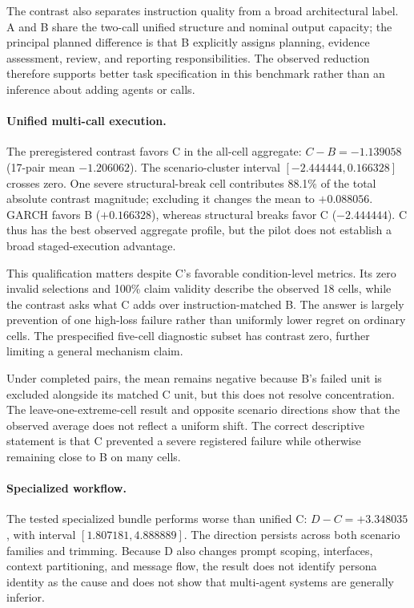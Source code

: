 The contrast also separates instruction quality from a broad architectural
label.  A and B share the two-call unified structure and nominal output
capacity; the principal planned difference is that B explicitly assigns
planning, evidence assessment, review, and reporting responsibilities.  The
observed reduction therefore supports better task specification in this
benchmark rather than an inference about adding agents or calls.

\paragraph{Unified multi-call execution.}
The preregistered contrast favors C in the all-cell aggregate:
\(C-B=-1.139058\) (17-pair mean \(-1.206062\)).  The scenario-cluster interval
\([-2.444444,0.166328]\) crosses zero.  One severe structural-break cell
contributes 88.1\% of the total absolute contrast magnitude; excluding it
changes the mean to \(+0.088056\).  GARCH favors B
(\(+0.166328\)), whereas structural breaks favor C
(\(-2.444444\)).  C thus has the best observed aggregate profile, but the
pilot does not establish a broad staged-execution advantage.

This qualification matters despite C's favorable condition-level metrics.
Its zero invalid selections and 100\% claim validity describe the observed 18
cells, while the contrast asks what C adds over instruction-matched B.  The
answer is largely prevention of one high-loss failure rather than uniformly
lower regret on ordinary cells.  The prespecified five-cell diagnostic subset
has contrast zero, further limiting a general mechanism claim.

Under completed pairs, the mean remains negative because B's failed unit is
excluded alongside its matched C unit, but this does not resolve
concentration.  The leave-one-extreme-cell result and opposite scenario
directions show that the observed average does not reflect a uniform shift.
The correct descriptive statement is that C prevented a severe registered
failure while otherwise remaining close to B on many cells.

\paragraph{Specialized workflow.}
The tested specialized bundle performs worse than unified C:
\(D-C=+3.348035\), with interval \([1.807181,4.888889]\).  The direction
persists across both scenario families and trimming.  Because D also changes
prompt scoping, interfaces, context partitioning, and message flow, the result
does not identify persona identity as the cause and does not show that
multi-agent systems are generally inferior.

